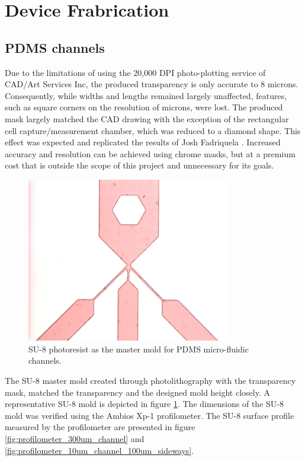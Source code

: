 
\section{Device Frabrication}

\subsection{PDMS channels}

\par Due to the limitations of using the 20,000 DPI photo-plotting service of CAD/Art Services Inc, the produced transparency is only accurate to 8 microns. Consequently, while widths and lengths remained largely unaffected, features, such as square corners on the resolution of microns, were lost. The produced mask largely matched the CAD drawing with the exception of the rectangular cell capture/measurement chamber, which was reduced to a diamond shape. This effect was expected and replicated the results of Josh Fadriquela \cite{fadriquela_design_2009-1}. Increased accuracy and resolution can be achieved using chrome masks, but at a premium cost that is outside the scope of this project and unnecessary for its goals. 

\begin{figure}[H]
    \centering
    \includegraphics[width=0.8\textwidth]{images/su8_results.png}
    \caption{SU-8 photoresist as the master mold for PDMS micro-fluidic channels.}
    \label{fig:su8_results}
\end{figure}

\par The SU-8 master mold created through photolithography with the transparency mask, matched the transparency and the designed mold height closely. A representative SU-8 mold is depicted in figure \ref{fig:su8_results}. The dimensions of the SU-8 mold was verified using the Ambios Xp-1 profilometer. The SU-8 surface profile measured by the profilometer are presented in figure \ref{fig:profilometer_300um_channel} and \ref{fig:profilometer_10um_channel_100um_sideways}. 


